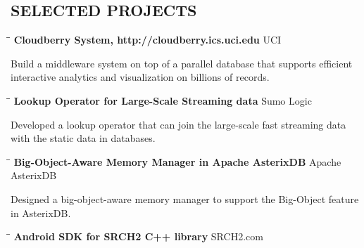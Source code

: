 \documentclass{res}
\begin{document}
\begin{resume}
\section{SELECTED PROJECTS}
   \vspace{-0.1in}
   \begin{tabbing}
   \hspace{2in}\= \hspace{3in}\= \kill %
   {\bf Cloudberry System, http://cloudberry.ics.uci.edu}\>  \>UCI\\
   \end{tabbing}\vspace{-30pt}      %
   Build a middleware system on top of a parallel database that supports efficient interactive analytics and visualization on billions of records.
   \vspace{-0.1in}
   \begin{tabbing}
   \hspace{2in}\= \hspace{3in}\= \kill %
    {\bf Lookup Operator for Large-Scale Streaming data}\>  \>Sumo Logic\\
   \end{tabbing}\vspace{-30pt}      %
   Developed a lookup operator that can join the large-scale fast streaming data with the static data in databases.
   \vspace{-0.1in}
   \begin{tabbing}
   \hspace{2in}\= \hspace{3in}\= \kill %
    {\bf Big-Object-Aware Memory Manager in Apache AsterixDB }\>  \>Apache AsterixDB\\
   \end{tabbing}\vspace{-30pt}      %
   Designed a big-object-aware memory manager to support the Big-Object feature in AsterixDB.
   \vspace{-0.1in}
   \begin{tabbing}
   \hspace{2in}\= \hspace{3in}\= \kill %
    {\bf Android SDK for SRCH2 C++ library }\>  \>SRCH2.com\\

\end{tabbing}
\end{resume}
\end{document}
